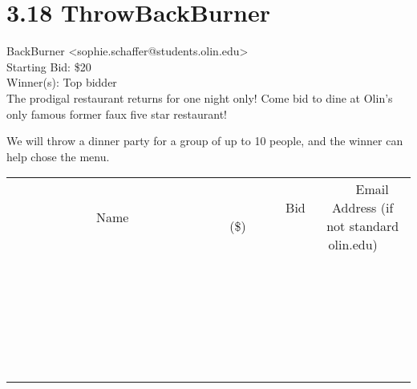 \documentclass[11pt]{article}
\begin{document}
					\section*{3.18 ThrowBackBurner}
					BackBurner <sophie.schaffer@students.olin.edu> \\
					Starting Bid: \$20 \\
					Winner(s): Top bidder \\
					The prodigal restaurant returns for one night only! Come bid to dine at Olin's only famous former faux five star restaurant! 

We will throw a dinner party for a group of up to 10 people, and the winner can help chose the menu. \\
					[6ex]
					\begin{tabular}{c c c}
						~~~~~~~~~~~~~Name~~~~~~~~~~~~~ & ~~~~~~~~~Bid (\$)~~~~~~~~~ & ~~~Email Address (if not standard olin.edu)~~~ \\
				
 & & \\
\hline
 & & \\
\hline
 & & \\
\hline
 & & \\
\hline
 & & \\
\hline
 & & \\
\hline
 & & \\
\hline
 & & \\
\hline
 & & \\
\hline
 & & \\
\hline
 & & \\
\hline
 & & \\
\hline
 & & \\
\hline
 & & \\
\hline
 & & \\
\hline
 & & \\
\hline
 & & \\
\hline
 & & \\
\hline
 & & \\
\hline
 & & \\
\hline
 & & \\
\hline
 & & \\
\hline
 & & \\
\hline
 & & \\
\hline
 & & \\
\hline
 & & \\
\hline
					\end{tabular}
					\clearpage
				
\end{document}

